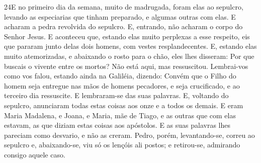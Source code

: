 \medskip

\lettrine{24} E no primeiro dia da semana, muito de madrugada,
foram elas ao sepulcro, levando as especiarias que tinham preparado,
e algumas outras com elas. E acharam a pedra revolvida do
sepulcro. E, entrando, não acharam o corpo do Senhor Jesus.
E aconteceu que, estando elas muito perplexas a esse respeito,
eis que pararam junto delas dois homens, com vestes resplandecentes.
E, estando elas muito atemorizadas, e abaixando o rosto para o
chão, eles lhes disseram: Por que buscais o vivente entre os mortos?
Não está aqui, mas ressuscitou. Lembrai-vos como vos falou,
estando ainda na Galiléia, dizendo: Convém que o Filho do homem
seja entregue nas mãos de homens pecadores, e seja crucificado, e ao
terceiro dia ressuscite. E lembraram-se das suas palavras.
E, voltando do sepulcro, anunciaram todas estas coisas aos onze
e a todos os demais. E eram Maria Madalena, e Joana, e Maria,
mãe de Tiago, e as outras que com elas estavam, as que diziam estas
coisas aos apóstolos. E as suas palavras lhes pareciam como
desvario, e não as creram. Pedro, porém, levantando-se,
correu ao sepulcro e, abaixando-se, viu só os lençóis ali postos; e
retirou-se, admirando consigo aquele caso.

